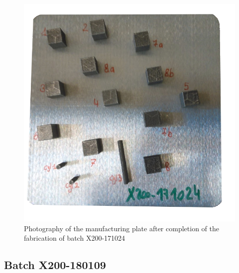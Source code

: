 \begin{figure}[ht]
\centering
\includegraphics[scale=0.45]{Images/171024-real}
\decoRule
\caption[Photography of the manufacturing plate after completion of the fabrication of batch X200-171024]{Photography of the manufacturing plate after completion of the fabrication of batch X200-171024}
\label{fig:171024-real}
\end{figure}


\subsection{Batch X200-180109}

